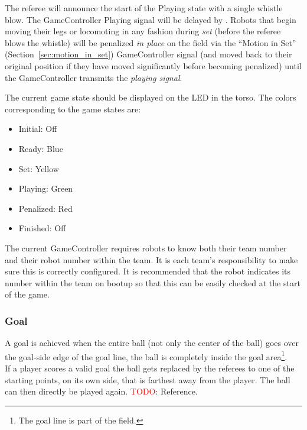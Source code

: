 The referee will announce the start of the Playing state with a single whistle blow.
The GameController Playing signal will be delayed by \PlayingDelayTime.
Robots that begin moving their legs or locomoting in any fashion during \emph{set} (\ie before the referee blows the whistle) will be penalized \textit{in place} on the field via the ``Motion in Set'' (\cf Section~\ref{sec:motion_in_set}) GameController signal (and moved back to their original position if they have moved significantly before becoming penalized) until the GameController transmits the \emph{playing signal}.

The current game state should be displayed on the LED in the torso. The colors corresponding to the game states are:

\begin{itemize}
	
	\item Initial: Off
	
	\item Ready: Blue
	
	\item Set: Yellow
	
	\item Playing: Green
	
	\item Penalized: Red
	
	\item Finished: Off
	
\end{itemize}

The current GameController requires robots to know both their team number and their robot number within the team. It is each team's responsibility to make sure this is correctly configured. It is recommended that the robot indicates its number within the team on bootup so that this can be easily checked at the start of the game.

\subsubsection{Goal}
\label{sec:goal}
A goal is achieved when the entire ball (not only the center of the ball) goes over the goal-side edge of the goal line, \ie the ball is completely inside the goal area\footnote{The goal line is part of the field.}. \\
If a player scores a valid goal the ball gets replaced by the referees to one of the starting points, on its own side, that is farthest away from the player. The ball can then directly be played again. 
\textcolor{red}{TODO}: Reference.

